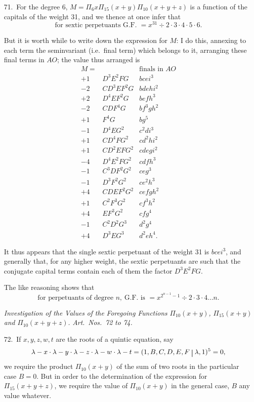 \documentclass[11pt]{article}
\begin{document}
71.\ For the degree 6, $M = \Pi_6 x \Pi_{15} (x + y) \Pi_{10}(x + y + z)$ is a function of the capitals of the weight 31, and we thence at once infer that
\[
\text{for sextic perpetuants G.F.\ }= x^{31} \div 2 \cdot 3 \cdot 4 \cdot 5 \cdot 6.
\]

\clearpage
But it is worth while to write down the expression for $M$: I do this, annexing to each term the seminvariant (i.e.\ final term) which belongs to it, arranging these final terms in $AO$; the value thus arranged is
\[
\begin{array}{rll}
M = & & \text{finals in } AO \\
+ 1 & D^3E^2FG & bcei^3 \\
- 2 & CD^3EF^2G & bdehi^2 \\
+ 2 & D^4EF^2G & befh^3 \\
- 2 & CDF^4G & bf^3gh^2 \\
+ 1 & F^4G & bg^5 \\
- 1 & D^4EG^2 & c^2di^3 \\
+ 1 & CD^4FG^2 & cd^2hi^2 \\
+ 1 & CD^2EFG^2 & cdegi^2 \\
- 4 & D^4E^2FG^2 & cdfh^3 \\
- 1 & C^3DF^2G^2 & ceg^3 \\
- 1 & D^3F^2G^2 & ce^2h^3 \\
+ 4 & CDEF^2G^2 & cefgh^2 \\
+ 1 & C^2F^3G^2 & cf^3h^2 \\
+ 4 & EF^3G^2 & cfg^4 \\
- 1 & C^2D^2G^3 & d^2g^4 \\
+ 4 & D^3EG^3 & d^2eh^4.
\end{array}
\]

It thus appears that the single sextic perpetuant of the weight 31 is $bcei^3$, and generally that, for any higher weight, the sextic perpetuants are such that the conjugate capital terms contain each of them the factor $D^3E^2FG$.

The like reasoning shows that
\[
\text{for perpetuants of degree } n,\ \text{G.F.\ is } = x^{2^{n-1}-1} \div 2 \cdot 3 \cdot 4 \ldots n.
\]

\medskip
\begin{center}
\textit{Investigation of the Values of the Foregoing Functions $\Pi_{10}(x + y)$, $\Pi_{15}(x + y)$ and $\Pi_{10}(x + y + z)$. Art.\ Nos.\ 72 to 74.}
\end{center}

72.\ If $x, y, z, w, t$ are the roots of a quintic equation, say
\[
\lambda - x \cdot \lambda - y \cdot \lambda - z \cdot \lambda - w \cdot \lambda - t = (1, B, C, D, E, F\,\,\rule[-1ex]{0.6pt}{2.5ex}\,\,\lambda, 1)^5 = 0,
\]
we require the product $\Pi_{10}(x + y)$ of the sum of two roots in the particular case $B = 0$. But in order to the determination of the expression for $\Pi_{15}(x + y + z)$, we require the value of $\Pi_{10}(x + y)$ in the general case, $B$ any value whatever.
\end{document}
